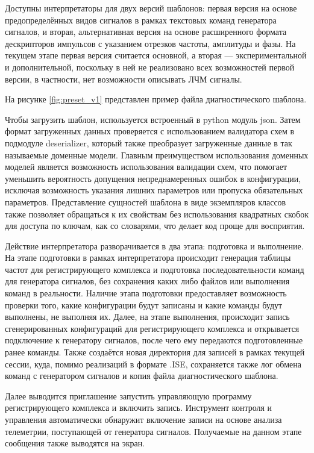 \documentclass{report}
\begin{document}
Доступны интерпретаторы для двух версий шаблонов: первая версия на основе предопределённых видов сигналов в рамках текстовых команд генератора сигналов, и вторая, альтернативная версия на основе расширенного формата дескрипторов импульсов с указанием отрезков частоты, амплитуды и фазы. На текущем этапе первая версия считается основной, а вторая --- экспериментальной и дополнительной, поскольку в ней не реализовано всех возможностей первой версии, в частности, нет возможности описывать ЛЧМ сигналы.

На рисунке \ref{fig:preset_v1} представлен пример файла диагностического шаблона.


Чтобы загрузить шаблон, используется встроенный в python модуль json. Затем формат загруженных данных проверяется с использованием валидатора схем в подмодуле deserializer, который также преобразует загруженные данные в так называемые доменные модели. Главным преимуществом использования доменных моделей является возможность использования валидации схем, что помогает уменьшить вероятность допущения непреднамеренных ошибок в конфигурации, исключая возможность указания лишних параметров или пропуска обязательных параметров. Представление сущностей шаблона в виде экземпляров классов также позволяет обращаться к их свойствам без использования квадратных скобок для доступа по ключам, как со словарями, что делает код проще для восприятия.

Действие интерпретатора разворачивается в два этапа: подготовка и выполнение. На этапе подготовки в рамках интерпретатора происходит генерация таблицы частот для регистрирующего комплекса и подготовка последовательности команд для генератора сигналов, без сохранения каких либо файлов или выполнения команд в реальности. Наличие этапа подготовки предоставляет возможность проверки того, какие конфигурации будут записаны и какие команды будут выполнены, не выполняя их. Далее, на этапе выполнения, происходит запись сгенерированных конфигураций для регистрирующего комплекса и открывается подключение к генератору сигналов, после чего ему передаются подготовленные ранее команды. Также создаётся новая директория для записей в рамках текущей сессии, куда, помимо реализаций в формате .ISE, сохраняется также лог обмена команд с генератором сигналов и копия файла диагностического шаблона.

Далее выводится приглашение запустить управляющую программу регистрирующего комплекса и включить запись. Инструмент контроля и управления автоматически обнаружит включение записи на основе анализа телеметрии, поступающей от генератора сигналов. Получаемые на данном этапе сообщения также выводятся на экран.
\end{document}
